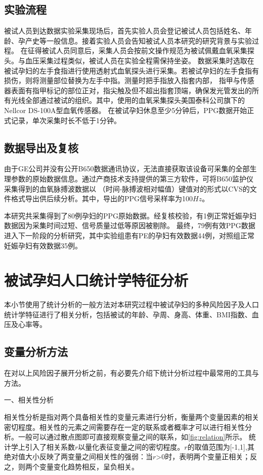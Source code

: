 \subsection{实验流程}
被试人员到达数据实验采集现场后，首先实验人员会登记被试人员包括姓名、年龄、孕产史等一般信息。接着实验人员会告知被试人员本研究的研究背景与实验过程。
在征得被试人员同意后，采集人员会按前文操作规范为被试佩戴血氧采集探头\cite{Chen2021}。与血压采集过程类似\cite{FIGO}，被试人员在实验全程需保持坐姿。
数据采集时选取在被试孕妇的左手食指进行使用透射式血氧探头进行采集。若被试孕妇的左手食指有损伤，则将测量部位替换为左手中指。测量时把手指放入指套内部，
指甲与传感器表面有指甲标记的部位正对，指尖触及但不超出指套顶端，确保发光管发出的所有光线全部通过被试的组织。其中，使用的血氧采集探头美国泰科公司旗下的Nellcor DS-100A型血氧传感器。 
在被试孕妇休息至少5分钟后，PPG数据开始正式记录，单次采集时长不低于1分钟。
\subsection{数据导出及复核}
由于GE公司并没有公开B650数据通讯协议，无法直接获取该设备可采集的全部生理参数的原始数据信息。通过产商技术支持提供的第三方软件，可将B650监护仪采集得到的血氧脉搏波数据以
（时间-脉搏波相对幅值）键值对的形式以CVS的文件格式导出供后续分析。其中，导出的PPG信号采样率为100$Hz$。

本研究共采集得到了80例孕妇的PPG原始数据。经复核校验，有1例正常妊娠孕妇数据因为采集时间过短、信号质量过低等原因被剔除。
最终，79例有效PPG数据进入下一阶段的分析研究，其中实验组患有PE的孕妇有效数据44例，对照组正常妊娠孕妇有效数据35例。
\section{被试孕妇人口统计学特征分析}
本小节使用了统计分析的一般方法对本研究过程中被试孕妇的多种风险因子及人口统计学特征进行了相关分析，包括被试的年龄、孕周、身高、体重、BMI指数、血压及心率等。
\subsection{变量分析方法}
在对以上风险因子展开分析之前，有必要先介绍下统计分析过程中最常用的工具与方法。

一、相关性分析

相关性分析是指对两个具备相关性的变量元素进行分析，衡量两个变量因素的相关密切程度\cite{Zhang2019}。相关性的元素之间需要存在一定的联系或者概率才可以进行相关性分析。一般可以通过散点图即可直接观察变量之间的联系，如\autoref{fig:relation}所示。
统计学上引入了相关系数$r$以量化表征变量之间的密切程度。$r$的取值范围为[-1,1],其绝对值大小反映了两变量之间相关性的强弱：当$r$>0时，表明两个变量正相关；反之，则两个变量变化趋势相反，呈负相关。

